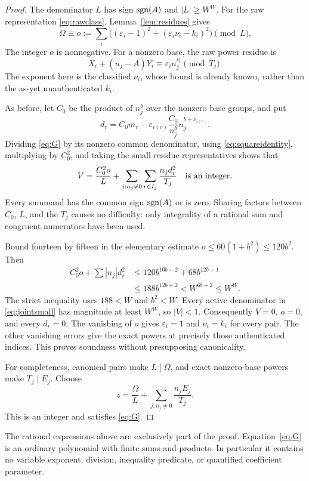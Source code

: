 \documentclass[11pt]{article}
\theoremstyle{definition}\newtheorem{definition}[theorem]{Definition}
\begin{document}
\begin{proof}
The denominator $L$ has sign $\operatorname{sgn}(A)$ and $|L|\ge W^W$. For the raw
representation \eqref{eq:rawclass}, Lemma~\ref{lem:residues} gives
\[
 \Omega\equiv o:=\sum_i\bigl((\varepsilon_i-1)^2+
                     (\varepsilon_i\nu_i-k_i)^2\bigr)\pmod L.
\]
The integer $o$ is nonnegative. For a nonzero base, the raw power residue is
\[
 X_i+(n_j-A)Y_i\equiv\varepsilon_i n_j^{\nu_i}\pmod{T_j}.
\]
The exponent here is the classified $\nu_i$, whose bound is already
known, rather than the as-yet unauthenticated $k_i$.

As before, let $C_0$ be the product of $n_j^b$ over the nonzero base
groups, and put
\[
 d_r=C_0m_r-\varepsilon_{i(r)}\frac{C_0}{n_j^b}n_j^{b+\nu_{i(r)}}.
\]
Dividing \eqref{eq:G} by its nonzero common denominator, using
\eqref{eq:squareidentity}, multiplying by $C_0^2$, and taking the small
residue representatives shows that
\begin{equation}\label{eq:jointsmall}
 V=\frac{C_0^2o}{L}+
       \sum_{j:n_j\ne0}\sum_{r\in I_j}\frac{n_jd_r^2}{T_j}
       \quad\hbox{is an integer}.
\end{equation}
Every summand has the common sign $\operatorname{sgn}(A)$ or is zero. Sharing factors
between $C_0$, $L$, and the $T_j$ causes no difficulty: only integrality
of a rational sum and congruent numerators have been used.

Bound fourteen by fifteen in the elementary estimate
$o\le60(1+b^2)\le120b^2$. Then
\begin{align*}
 C_0^2o+\sum |n_j|d_r^2
 &\le120b^{10b+2}+68b^{12b+1}\\
 &\le188b^{12b+2}<W^{6b+2}\le W^W.
\end{align*}
The strict inequality uses $188<W$ and $b^2<W$. Every active denominator
in \eqref{eq:jointsmall} has magnitude at least $W^W$, so $|V|<1$.
Consequently $V=0$, $o=0$, and every $d_r=0$.
The vanishing of $o$ gives $\varepsilon_i=1$ and $\nu_i=k_i$ for every
pair. The other vanishing errors give the exact powers at precisely those
authenticated indices. This proves soundness without presupposing
canonicality.

For completeness, canonical pairs make $L\mid\Omega$, and exact
nonzero-base powers make $T_j\mid E_j$. Choose
\[
 z=\frac{\Omega}{L}+\sum_{j:n_j\ne0}\frac{n_jE_j}{T_j}.
\]
This is an integer and satisfies \eqref{eq:G}.
\end{proof}

The rational expressions above are exclusively part of the proof.
Equation~\eqref{eq:G} is an ordinary polynomial with finite sums and
products. In particular it contains no variable exponent, division,
inequality predicate, or quantified coefficient parameter.
\end{document}

